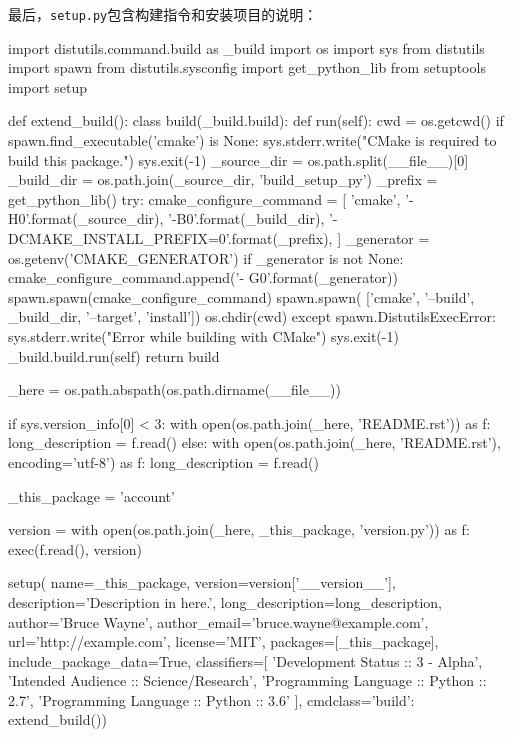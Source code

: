最后，\texttt{setup.py}包含构建指令和安装项目的说明：

\begin{codebox}[python]
import distutils.command.build as _build
import os
import sys
from distutils import spawn
from distutils.sysconfig import get_python_lib
from setuptools import setup


def extend_build():
  class build(_build.build):
    def run(self):
      cwd = os.getcwd()
      if spawn.find_executable('cmake') is None:
        sys.stderr.write("CMake is required to build this package.\n")
        sys.exit(-1)
        _source_dir = os.path.split(__file__)[0]
        _build_dir = os.path.join(_source_dir, 'build_setup_py')
        _prefix = get_python_lib()
        try:
          cmake_configure_command = [
              'cmake',
              '-H{0}'.format(_source_dir),
              '-B{0}'.format(_build_dir),
              '-DCMAKE_INSTALL_PREFIX={0}'.format(_prefix),
          ]
          _generator = os.getenv('CMAKE_GENERATOR')
          if _generator is not None:
            cmake_configure_command.append('-
                                          G{0}'.format(_generator))
          spawn.spawn(cmake_configure_command)
          spawn.spawn(
                ['cmake', '--build', _build_dir, '--target', 'install'])
          os.chdir(cwd)
        except spawn.DistutilsExecError:
          sys.stderr.write("Error while building with CMake\n")
          sys.exit(-1)
          _build.build.run(self)
  return build

_here = os.path.abspath(os.path.dirname(__file__))

if sys.version_info[0] < 3:
  with open(os.path.join(_here, 'README.rst')) as f:
    long_description = f.read()
else:
  with open(os.path.join(_here, 'README.rst'), encoding='utf-8') as f:
    long_description = f.read()

_this_package = 'account'

version = {}
with open(os.path.join(_here, _this_package, 'version.py')) as f:
  exec(f.read(), version)
  
setup(
    name=_this_package,
    version=version['__version__'],
    description='Description in here.',
    long_description=long_description,
    author='Bruce Wayne',
    author_email='bruce.wayne@example.com',
    url='http://example.com',
    license='MIT',
    packages=[_this_package],
    include_package_data=True,
    classifiers=[
        'Development Status :: 3 - Alpha',
        'Intended Audience :: Science/Research',
        'Programming Language :: Python :: 2.7',
        'Programming Language :: Python :: 3.6'
    ],
    cmdclass={'build': extend_build()})
\end{codebox}

